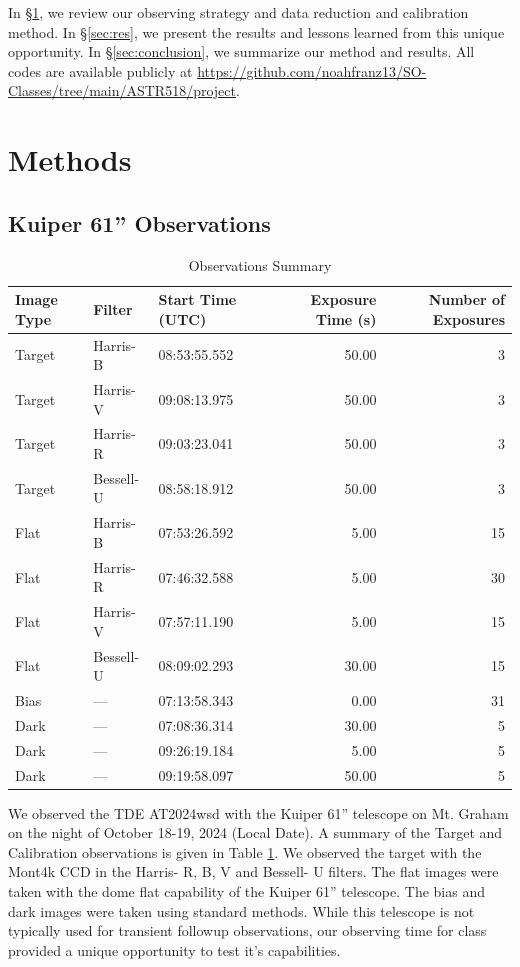 \documentclass{aastex631}
\begin{document}
In \S\ref{sec:method}, we review our observing strategy and data reduction and calibration method. In \S\ref{sec:res}, we present the results and lessons learned from this unique opportunity. In \S\ref{sec:conclusion}, we summarize our method and results. All codes are available publicly at \url{https://github.com/noahfranz13/SO-Classes/tree/main/ASTR518/project}.

\section{Methods}\label{sec:method}
\subsection{Kuiper 61'' Observations}

\begin{table}
  \centering
  \caption{Observations Summary}
  \label{tab:obs}
  \begin{tabular}{lllrr}
    \hline
    Image Type & Filter & Start Time (UTC) & Exposure Time (s) & Number of Exposures \\
    \hline
    Target & Harris-B & 08:53:55.552 & 50.00 & 3 \\
    Target & Harris-V & 09:08:13.975 & 50.00 & 3 \\
    Target & Harris-R & 09:03:23.041 & 50.00 & 3 \\
    Target & Bessell-U & 08:58:18.912 & 50.00 & 3 \\
    Flat & Harris-B & 07:53:26.592 & 5.00 & 15 \\
    Flat & Harris-R & 07:46:32.588 & 5.00 & 30 \\
    Flat & Harris-V & 07:57:11.190 & 5.00 & 15 \\
    Flat & Bessell-U & 08:09:02.293 & 30.00 & 15 \\
    Bias & --- & 07:13:58.343 & 0.00 & 31 \\
    Dark & --- & 07:08:36.314 & 30.00 & 5 \\
    Dark & --- & 09:26:19.184 & 5.00 & 5 \\
    Dark & --- & 09:19:58.097 & 50.00 & 5 \\
    \hline
  \end{tabular}
\end{table}

We observed the TDE AT2024wsd with the Kuiper 61'' telescope on Mt. Graham on the night of October 18-19, 2024 (Local Date). A summary of the Target and Calibration observations is given in Table \ref{tab:obs}. We observed the target with the Mont4k CCD in the Harris- R, B, V and Bessell- U filters. The flat images were taken with the dome flat capability of the Kuiper 61'' telescope. The bias and dark images were taken using standard methods. While this telescope is not typically used for transient followup observations, our observing time for class provided a unique opportunity to test it's capabilities. 
\end{document}
